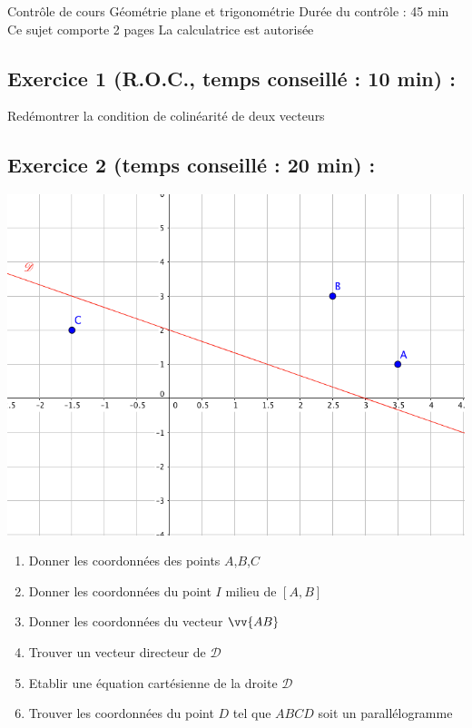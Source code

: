 

\usepackage{tcolorbox}
\usepackage[c]{esvect}
\newcommand{\covec}[2]{\begin{pmatrix}#1 \\#2 \end{pmatrix}}



\center
\Large
Contrôle de cours
\flushleft
\center
Géométrie plane et trigonométrie
\flushleft \normalsize
Durée du contrôle : 45 min\newline
Ce sujet comporte 2 pages\newline
La calculatrice est autorisée
\subsection*{Exercice 1 (R.O.C., temps conseillé : 10 min) : }
Redémontrer la condition de colinéarité de deux vecteurs
\subsection*{Exercice 2 (temps conseillé : 20 min) : }
\center
\includegraphics[scale=0.6]{chap56_ill.png}
\flushleft
\begin{enumerate}
\item Donner les coordonnées des points $A$,$B$,$C$
\item Donner les coordonnées du point $I$ milieu de $[A,B]$
\item Donner les coordonnées du vecteur $\vv{AB}$
\item Trouver un vecteur directeur de $\mathscr{D}$
\item Etablir une équation cartésienne de la droite $\mathscr{D}$
\item Trouver les coordonnées du point $D$ tel que $ABCD$ soit un parallélogramme 
\end{enumerate}
